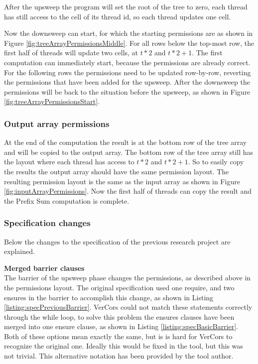 \documentclass[a4paper]{article}
\begin{document}
After the upsweep the program will set the root of the tree to zero, each thread has still access to the cell of its thread id, so each thread updates one cell.

Now the downsweep can start, for which the starting permissions are as shown in Figure \ref{fig:treeArrayPermissionsMiddle}. For all rows below the top-most row, the first half of threads will update two cells, at $t*2$ and $t*2+1$. The first computation can immediately start, because the permissions are already correct. For the following rows the permissions need to be updated row-by-row, reverting the permissions that have been added for the upsweep. After the downsweep the permissions will be back to the situation before the upsweep, as shown in Figure \ref{fig:treeArrayPermissionsStart}.

\subsubsection{Output array permissions}
At the end of the computation the result is at the bottom row of the tree array and will be copied to the output array. The bottom row of the tree array still has the layout where each thread has access to $t*2$ and $t*2+1$. So to easily copy the results the output array should have the same permission layout. The resulting permission layout is the same as the input array as shown in Figure \ref{fig:inputArrayPermissions}. Now the first half of threads can copy the result and the Prefix Sum computation is complete.


\subsubsection{Specification changes}
Below the changes to the specification of the previous research project are explained.

\textbf{Merged barrier clauses}\\
The barrier of the upsweep phase changes the permissions, as described above in the permissions layout. The original specification used one require, and two ensures in the barrier to accomplish this change, as shown in Listing \ref{listing:specPreviousBarrier}. VerCors could not match these statements correctly through the while loop, to solve this problem the ensures clauses have been merged into one ensure clause, as shown in Listing \ref{listing:specBasicBarrier}. Both of these options mean exactly the same, but is is hard for VerCors to recognize the original one. Ideally this would be fixed in the tool, but this was not trivial. This alternative notation has been provided by the tool author.
\end{document}
